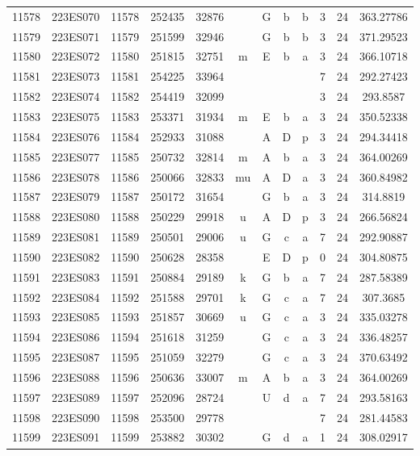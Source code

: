\begin{tabular}{|*{12}{c|}}
11578 & 223ES070 & 11578 & 252435 & 32876 &  & G & b & b & 3 & 24 & 363.27786 \\ 
11579 & 223ES071 & 11579 & 251599 & 32946 &  & G & b & b & 3 & 24 & 371.29523 \\ 
11580 & 223ES072 & 11580 & 251815 & 32751 & m & E & b & a & 3 & 24 & 366.10718 \\ 
11581 & 223ES073 & 11581 & 254225 & 33964 &  &  &  &  & 7 & 24 & 292.27423 \\ 
11582 & 223ES074 & 11582 & 254419 & 32099 &  &  &  &  & 3 & 24 & 293.8587 \\ 
11583 & 223ES075 & 11583 & 253371 & 31934 & m & E & b & a & 3 & 24 & 350.52338 \\ 
11584 & 223ES076 & 11584 & 252933 & 31088 &  & A & D & p & 3 & 24 & 294.34418 \\ 
11585 & 223ES077 & 11585 & 250732 & 32814 & m & A & b & a & 3 & 24 & 364.00269 \\ 
11586 & 223ES078 & 11586 & 250066 & 32833 & mu & A & D & a & 3 & 24 & 360.84982 \\ 
11587 & 223ES079 & 11587 & 250172 & 31654 &  & G & b & a & 3 & 24 & 314.8819 \\ 
11588 & 223ES080 & 11588 & 250229 & 29918 & u & A & D & p & 3 & 24 & 266.56824 \\ 
11589 & 223ES081 & 11589 & 250501 & 29006 & u & G & c & a & 7 & 24 & 292.90887 \\ 
11590 & 223ES082 & 11590 & 250628 & 28358 &  & E & D & p & 0 & 24 & 304.80875 \\ 
11591 & 223ES083 & 11591 & 250884 & 29189 & k & G & b & a & 7 & 24 & 287.58389 \\ 
11592 & 223ES084 & 11592 & 251588 & 29701 & k & G & c & a & 7 & 24 & 307.3685 \\ 
11593 & 223ES085 & 11593 & 251857 & 30669 & u & G & c & a & 3 & 24 & 335.03278 \\ 
11594 & 223ES086 & 11594 & 251618 & 31259 &  & G & c & a & 3 & 24 & 336.48257 \\ 
11595 & 223ES087 & 11595 & 251059 & 32279 &  & G & c & a & 3 & 24 & 370.63492 \\ 
11596 & 223ES088 & 11596 & 250636 & 33007 & m & A & b & a & 3 & 24 & 364.00269 \\ 
11597 & 223ES089 & 11597 & 252096 & 28724 &  & U & d & a & 7 & 24 & 293.58163 \\ 
11598 & 223ES090 & 11598 & 253500 & 29778 &  &  &  &  & 7 & 24 & 281.44583 \\ 
11599 & 223ES091 & 11599 & 253882 & 30302 &  & G & d & a & 1 & 24 & 308.02917 \\ 

\end{tabular}
